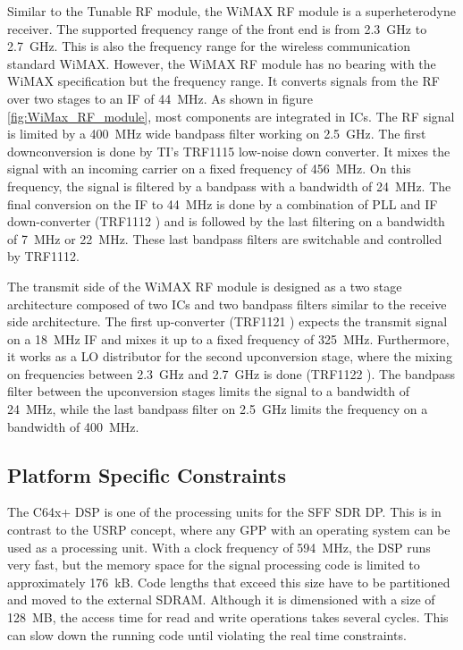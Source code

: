Similar to the Tunable RF module, the WiMAX RF module is a superheterodyne receiver. The supported frequency range of the front end is from \SI{2.3}{GHz} to \SI{2.7}{GHz}. This is also the frequency range for the wireless communication standard WiMAX. However, the WiMAX RF module has no bearing with the WiMAX specification but the frequency range. It converts signals from the \ac{RF} over two stages to an \ac{IF} of \SI{44}{MHz}. As shown in figure \ref{fig:WiMax_RF_module}, most components are integrated in \acp{IC}. The RF signal is limited by a \SI{400}{MHz} wide bandpass filter working on \SI{2.5}{GHz}. The first downconversion is done by \ac{TI}'s TRF1115 \cite{trf1115} low-noise down converter. It mixes the signal with an incoming carrier on a fixed frequency of \SI{456}{MHz}. On this frequency, the signal is filtered by a bandpass with a bandwidth of \SI{24}{MHz}. The final conversion on the \ac{IF} to \SI{44}{MHz} is done by a combination of \ac{PLL} and \ac{IF} down-converter (TRF1112 \cite{trf1112}) and is followed by the last filtering on a bandwidth of \SI{7}{MHz} or \SI{22}{MHz}. These last bandpass filters are switchable and controlled by TRF1112.

The transmit side of the WiMAX RF module is designed as a two stage architecture composed of two \acp{IC} and two bandpass filters similar to the receive side architecture. The first up-converter (TRF1121 \cite{trf1121}) expects the transmit signal on a \SI{18}{MHz} \ac{IF} and mixes it up to a fixed frequency of \SI{325}{MHz}. Furthermore, it works as a \ac{LO} distributor for the second upconversion stage, where the mixing on frequencies between \SI{2.3}{GHz} and \SI{2.7}{GHz} is done (TRF1122 \cite{trf1122}). The bandpass filter between the upconversion stages limits the signal to a bandwidth of \SI{24}{MHz}, while the last bandpass filter on \SI{2.5}{GHz} limits the frequency on a  bandwidth of \SI{400}{MHz}.

\subsection{Platform Specific Constraints}
The C64x+ DSP is one of the processing units for the SFF SDR DP. This is in contrast to the USRP concept, where any GPP with an operating system can be used as a processing unit. With a clock frequency of \SI{594}{MHz}, the \ac{DSP} runs very fast, but the memory space for the signal processing code is limited to approximately \SI{176}{kB}. Code lengths that exceed this size have to be partitioned and moved to the external \ac{SDRAM}. Although it is dimensioned with a size of \SI{128}{MB}, the access time for read and write operations takes several cycles. This can slow down the running code until violating the real time constraints.

